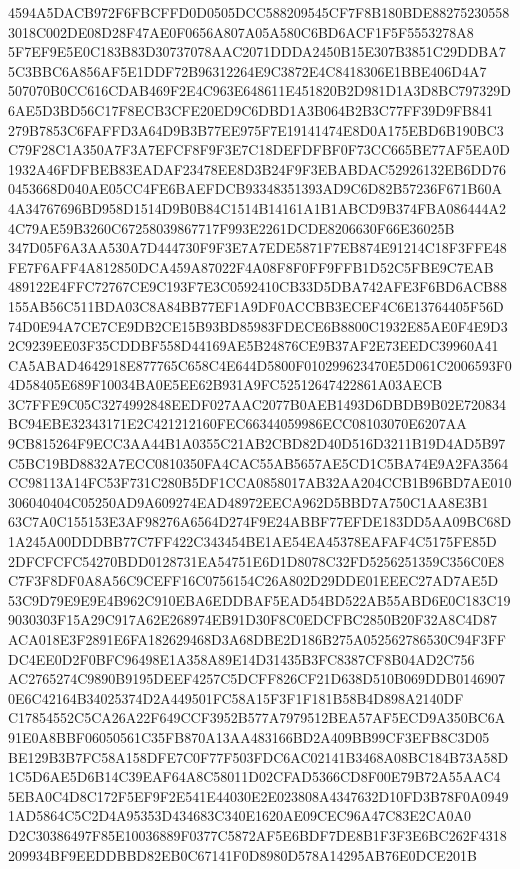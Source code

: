 \documentclass[UTF8,fontset=fandol,zihao=-4,a4paper]{ctexart}
\begin{document}
{{4594A5DACB972F6FBCFFD0D0505DCC588209545CF7F8B180BDE882752305583018C002DE08D28F47AE0F0656A807A05A580C6BD6ACF1F5F5553278A8
5F7EF9E5E0C183B83D30737078AAC2071DDDA2450B15E307B3851C29DDBA75C3BBC6A856AF5E1DDF72B96312264E9C3872E4C8418306E1BBE406D4A7
507070B0CC616CDAB469F2E4C963E648611E451820B2D981D1A3D8BC797329D6AE5D3BD56C17F8ECB3CFE20ED9C6DBD1A3B064B2B3C77FF39D9FB841
279B7853C6FAFFD3A64D9B3B77EE975F7E19141474E8D0A175EBD6B190BC3C79F28C1A350A7F3A7EFCF8F9F3E7C18DEFDFBF0F73CC665BE77AF5EA0D
1932A46FDFBEB83EADAF23478EE8D3B24F9F3EBABDAC52926132EB6DD760453668D040AE05CC4FE6BAEFDCB93348351393AD9C6D82B57236F671B60A
4A34767696BD958D1514D9B0B84C1514B14161A1B1ABCD9B374FBA086444A24C79AE59B3260C67258039867717F993E2261DCDE8206630F66E36025B
347D05F6A3AA530A7D444730F9F3E7A7EDE5871F7EB874E91214C18F3FFE48FE7F6AFF4A812850DCA459A87022F4A08F8F0FF9FFB1D52C5FBE9C7EAB
489122E4FFC72767CE9C193F7E3C0592410CB33D5DBA742AFE3F6BD6ACB88155AB56C511BDA03C8A84BB77EF1A9DF0ACCBB3ECEF4C6E13764405F56D
74D0E94A7CE7CE9DB2CE15B93BD85983FDECE6B8800C1932E85AE0F4E9D32C9239EE03F35CDDBF558D44169AE5B24876CE9B37AF2E73EEDC39960A41
CA5ABAD4642918E877765C658C4E644D5800F010299623470E5D061C2006593F04D58405E689F10034BA0E5EE62B931A9FC52512647422861A03AECB
3C7FFE9C05C3274992848EEDF027AAC2077B0AEB1493D6DBDB9B02E720834BC94EBE32343171E2C421212160FEC66344059986ECC08103070E6207AA
9CB815264F9ECC3AA44B1A0355C21AB2CBD82D40D516D3211B19D4AD5B97C5BC19BD8832A7ECC0810350FA4CAC55AB5657AE5CD1C5BA74E9A2FA3564
CC98113A14FC53F731C280B5DF1CCA0858017AB32AA204CCB1B96BD7AE010306040404C05250AD9A609274EAD48972EECA962D5BBD7A750C1AA8E3B1
63C7A0C155153E3AF98276A6564D274F9E24ABBF77EFDE183DD5AA09BC68D1A245A00DDDBB77C7FF422C343454BE1AE54EA45378EAFAF4C5175FE85D
2DFCFCFC54270BDD0128731EA54751E6D1D8078C32FD5256251359C356C0E8C7F3F8DF0A8A56C9CEFF16C0756154C26A802D29DDE01EEEC27AD7AE5D
53C9D79E9E9E4B962C910EBA6EDDBAF5EAD54BD522AB55ABD6E0C183C199030303F15A29C917A62E268974EB91D30F8C0EDCFBC2850B20F32A8C4D87
ACA018E3F2891E6FA182629468D3A68DBE2D186B275A052562786530C94F3FFDC4EE0D2F0BFC96498E1A358A89E14D31435B3FC8387CF8B04AD2C756
AC2765274C9890B9195DEEF4257C5DCFF826CF21D638D510B069DDB01469070E6C42164B34025374D2A449501FC58A15F3F1F181B58B4D898A2140DF
C17854552C5CA26A22F649CCF3952B577A7979512BEA57AF5ECD9A350BC6A91E0A8BBF06050561C35FB870A13AA483166BD2A409BB99CF3EFB8C3D05
BE129B3B7FC58A158DFE7C0F77F503FDC6AC02141B3468A08BC184B73A58D1C5D6AE5D6B14C39EAF64A8C58011D02CFAD5366CD8F00E79B72A55AAC4
5EBA0C4D8C172F5EF9F2E541E44030E2E023808A4347632D10FD3B78F0A09491AD5864C5C2D4A95353D434683C340E1620AE09CEC96A47C83E2CA0A0
D2C30386497F85E10036889F0377C5872AF5E6BDF7DE8B1F3F3E6BC262F4318209934BF9EEDDBBD82EB0C67141F0D8980D578A14295AB76E0DCE201B
}}
\end{document}
